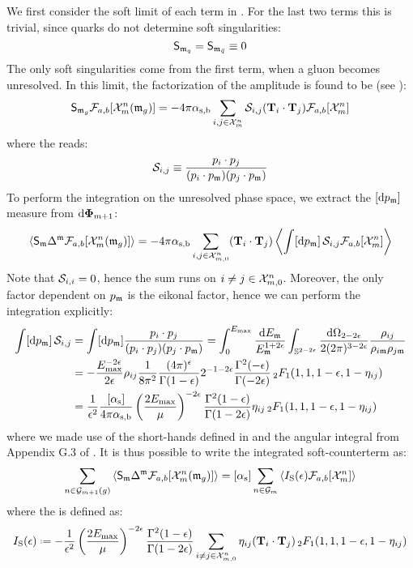 We first consider the soft limit of each term in . For the last two terms this is trivial, since quarks do not determine soft singularities:
\begin{equation*}
  \mathsf{S}_{\mathfrak{m}_q} = \mathsf{S}_{\mathfrak{m}_{\bar{q}}} \equiv 0
\end{equation*}
The only soft singularities come from the first term, when a gluon becomes unresolved. In this limit, the factorization of the amplitude is found to be (see \cite{Catani-1997}):
\begin{equation}
  \mathsf{S}_{\mathfrak{m}_g} \mathcal{F}_{a,b}[\mathcal{X}^{n}_{m}(\mathfrak{m}_g)] = - 4\pi \alpha_\text{s,b} \sum_{i,j \in \mathcal{X}^{n}_{m}} \mathcal{S}_{i,j} (\mathbf{T}_i \cdot \mathbf{T}_j) \mathcal{F}_{a,b}[\mathcal{X}^{n}_{m}]
\end{equation}
where the  reads:
\begin{equation}
  \mathcal{S}_{i,j} \equiv \frac{p_i \cdot p_j}{(p_i \cdot p_{\mathfrak{m}}) (p_j \cdot p_{\mathfrak{m}})}
\end{equation}
To perform the integration on the unresolved phase space, we extract the $ [\mathrm{d} p_{\mathfrak{m}}] $ measure from $ \mathrm{d} \boldsymbol{\Phi}_{m+1} $:
\begin{equation*}
  \left\langle \mathsf{S}_{\mathfrak{m}} \Delta^{\mathfrak{m}} \mathcal{F}_{a,b}[\mathcal{X}^{n}_{m}(\mathfrak{m}_g)] \right\rangle = - 4\pi \alpha_\text{s,b} \sum_{i,j \in \mathcal{X}^{n}_{m,0}} (\mathbf{T}_i \cdot \mathbf{T}_j) \left\langle \int [\mathrm{d} p_{\mathfrak{m}}] \, \mathcal{S}_{i,j} \mathcal{F}_{a,b}[\mathcal{X}^{n}_{m}] \right\rangle
\end{equation*}
Note that $ \mathcal{S}_{i,i} = 0 $, hence the sum runs on $ i \neq j \in \mathcal{X}^{n}_{m,0} $. Moreover, the only factor dependent on $ p_{\mathfrak{m}} $ is the eikonal factor, hence we can perform the integration explicitly:
\begin{equation*}
  \begin{split}
    \int [\mathrm{d} p_{\mathfrak{m}}] \, \mathcal{S}_{i,j}
    & = \int [\mathrm{d} p_{\mathfrak{m}}] \frac{p_i \cdot p_j}{(p_i \cdot p_j) (p_j \cdot p_{\mathfrak{m}})} = \int_0^{E_\text{max}} \frac{\mathrm{d} E_{\mathfrak{m}}}{E_{\mathfrak{m}}^{1+2\epsilon}} \int_{\mathbb{S}^{2-2\epsilon}} \frac{\mathrm{d} \Omega_{2-2\epsilon}}{2(2\pi)^{3-2\epsilon}} \frac{\rho_{ij}}{\rho_{i\mathfrak{m}} \rho_{j\mathfrak{m}}} \\
    & = - \frac{E_\text{max}^{-2\epsilon}}{2\epsilon} \rho_{ij} \frac{1}{8\pi^2} \frac{(4\pi)^\epsilon}{\Gamma(1-\epsilon)} 2^{-1-2\epsilon} \frac{\Gamma^2(-\epsilon)}{\Gamma(-2\epsilon)} \,{_2F_1}(1,1,1-\epsilon,1-\eta_{ij}) \\
    & = \frac{1}{\epsilon^2} \frac{[\alpha_\text{s}]}{4\pi \alpha_\text{s,b}} \left( \frac{2E_\text{max}}{\mu} \right)^{-2\epsilon} \frac{\Gamma^2(1-\epsilon)}{\Gamma(1-2\epsilon)} \eta_{ij} \,{_2F_1}(1,1,1-\epsilon,1-\eta_{ij})
  \end{split}
\end{equation*}
where we made use of the short-hands defined in  and the angular integral from Appendix G.3 of \cite{Asteriadis-2020}. It is thus possible to write the integrated soft-counterterm as:
\begin{equation}
  \sum_{n \in \mathcal{G}_{m+1}(g)} \left\langle \mathsf{S}_{\mathfrak{m}} \Delta^{\mathfrak{m}} \mathcal{F}_{a,b}[\mathcal{X}^{n}_{m}(\mathfrak{m}_g)] \right\rangle = [\alpha_\text{s}] \sum_{n \in \mathcal{G}_m} \left\langle I_\text{S}(\epsilon) \mathcal{F}_{a,b}[\mathcal{X}^{n}_{m}] \right\rangle
\end{equation}
where the  is defined as:
\begin{equation}
  \iso(\de) \defeq - \frac{1}{\de^2} \left( \frac{2\ema}{\mu} \right)^{-2\de} \frac{\Gamma^2(1-\de)}{\Gamma(1-2\de)} \sum_{i \neq j \in \fsp{n}{m}} \eta_{ij} (\cc) \,\hyp(1,1,1-\de,1-\eta_{ij})
\end{equation}

